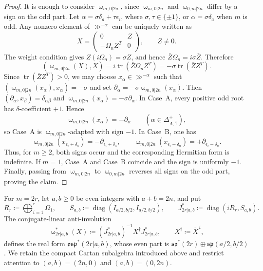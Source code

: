 \begin{proof}
It is enough to consider $\upomega_{m,0\vert 2n}$, since
$\upomega_{m,0\vert 2n}$ and $\upomega_{0,m\vert 2n}$ differ by a sign on
the odd part. Let $\alpha=\sigma\delta_a+\tau\epsilon_i$, where
$\sigma,\tau\in\{\pm1\}$, or $\alpha=\sigma\delta_a$ when $m$ is odd.
Any nonzero element of $\gg^{-\alpha}$ can be uniquely written as
\[
X=\begin{pmatrix}0&Z\\-\Omega_n Z^{T}&0\end{pmatrix},
\qquad Z\neq0.
\]
The weight condition gives $Z(i\Omega_n)=\sigma Z$, and hence
$\overline Z\Omega_n=i\sigma\overline Z$. Therefore
\[
(\upomega_{m,0\vert 2n}(X),X)
=
i\operatorname{tr}(\overline Z\Omega_n Z^{T})
=
-\sigma\operatorname{tr}(\overline Z Z^{T}).
\]
Since $\operatorname{tr}(\overline Z Z^T)>0$, we may choose
$x_\alpha\in\gg^{-\alpha}$ such that
$(\upomega_{m,0\vert 2n}(x_\alpha),x_\alpha)=-\sigma$ and set
$\partial_\alpha=-\sigma\upomega_{m,0\vert 2n}(x_\alpha)$. Then $(\partial_\alpha,x_\beta)=\delta_{\alpha\beta}$ and $\upomega_{m,0\vert 2n}(x_\alpha)=-\sigma\partial_\alpha$. In Case~A, every positive odd root has $\delta$-coefficient $+1$. Hence
\[
\upomega_{m,0\vert 2n}(x_\alpha)=-\partial_\alpha
\qquad
(\alpha\in\Delta_{A,\bar1}^{+}),
\]
so Case~A is $\upomega_{m,0\vert 2n}$-adapted with sign $-1$. In Case~B, one has
\[
\upomega_{m,0\vert 2n}(x_{\epsilon_i+\delta_a})
=
-\partial_{\epsilon_i+\delta_a},
\qquad
\upomega_{m,0\vert 2n}(x_{\epsilon_i-\delta_a})
=
+\partial_{\epsilon_i-\delta_a}.
\]
Thus, for $m\geq2$, both signs occur and the corresponding Hermitian form
is indefinite. If $m=1$, Case~A and Case~B coincide and the sign is
uniformly $-1$. Finally, passing from $\upomega_{m,0\vert 2n}$ to
$\upomega_{0,m\vert 2n}$ reverses all signs on the odd part, proving the
claim.
\end{proof}

For $m=2r$, let $a,b\geq0$ be even integers with $a+b=2n$, and put
\begin{equation}
R_r\coloneqq\bigoplus_{i=1}^{r}\Omega_1,\qquad
S_{a,b}\coloneqq\operatorname{diag}(I_{a/2,b/2},I_{a/2,b/2}),\qquad
J^{*}_{2r\vert a,b}\coloneqq\operatorname{diag}(iR_r,S_{a,b}).
\end{equation}
The conjugate-linear anti-involution
\begin{equation}
\upomega^{*}_{2r\vert a,b}(X)
\coloneqq(J^{*}_{2r\vert a,b})^{-1}X^\dagger J^{*}_{2r\vert a,b},
\qquad X^\dagger\coloneqq\overline X^{\,t},
\end{equation}
defines the real form $\mathfrak{osp}^{*}(2r\vert a,b)$, whose even part is
$\mathfrak{so}^{*}(2r)\oplus\mathfrak{sp}(a/2,b/2)$.
We retain the compact Cartan subalgebra introduced above and restrict attention to $(a,b)=(2n,0)$ and $(a,b)=(0,2n)$.


